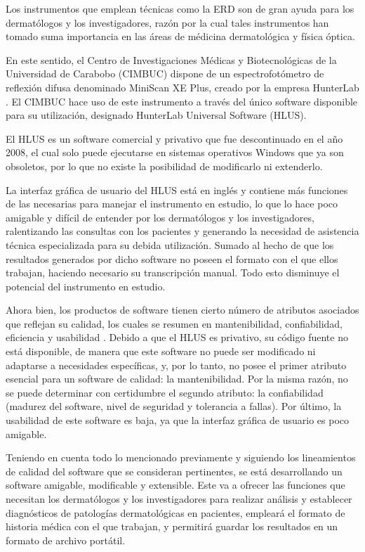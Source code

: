 \documentclass[conference]{IEEEtran}
\begin{document}
Los instrumentos que emplean t\'{e}cnicas como la ERD son de gran ayuda para los dermat\'{o}logos y los investigadores, raz\'{o}n por la cual tales instrumentos han tomado suma importancia en las \'{a}reas de m\'{e}dicina dermatol\'{o}gica y f\'{i}sica \'{o}ptica.

En este sentido, el Centro de Investigaciones M\'{e}dicas y Biotecnol\'{o}gicas de la Universidad de Carabobo \mbox{(CIMBUC)} dispone de un espectrofot\'{o}metro de reflexi\'{o}n difusa \mbox{denominado} MiniScan XE Plus, creado por la empresa HunterLab \cite{HunterLab}. El CIMBUC hace uso de este instrumento a trav\'{e}s del \'{u}nico software disponible para su utilizaci\'{o}n, designado HunterLab Universal Software (HLUS)\cite{HunterLab-manual}.

El HLUS es un software \mbox{comercial} y privativo que fue descontinuado en el a\~{n}o 2008, el cual solo puede ejecutarse en \mbox{sistemas} \mbox{operativos} Windows que ya son obsoletos, por lo que no existe la posibilidad de modificarlo ni extenderlo. 

La interfaz gr\'{a}fica de usuario del HLUS est\'{a} en ingl\'{e}s y contiene m\'{a}s funciones de las necesarias para manejar el instrumento en estudio, lo que lo hace poco amigable y dif\'{i}cil de entender por los dermat\'{o}logos y los investigadores, ralentizando las consultas con los pacientes y generando la necesidad de asistencia t\'{e}cnica especializada para su debida utilizaci\'{o}n. Sumado al hecho de que los resultados generados por dicho software no poseen el formato con el que ellos trabajan, haciendo necesario su transcripci\'{o}n manual. Todo esto disminuye el potencial del instrumento en estudio.

Ahora bien, los productos de software tienen cierto n\'{u}mero de atributos asociados que reflejan su calidad, los cuales se resumen en mantenibilidad, confiabilidad, eficiencia y usabilidad \cite{Sommerville}. Debido a que el HLUS es \mbox{privativo}, su c\'{o}digo fuente no est\'{a} disponible, de manera que este software no puede ser modificado ni adaptarse a necesidades espec\'{i}ficas, y, por lo tanto, no posee el primer atributo esencial para un software de calidad: la mantenibilidad. Por la misma raz\'{o}n, no se puede determinar con certidumbre el segundo atributo: la confiabilidad (madurez del software, nivel de seguridad y tolerancia a fallas). Por \'{u}ltimo, la usabilidad de este software es baja, ya que la interfaz gr\'{a}fica de usuario es poco amigable.

Teniendo en cuenta todo lo mencionado previamente y siguiendo los lineamientos de calidad del \mbox{software} que se consideran pertinentes, se est\'{a} desarrollando un \mbox{software} amigable, modificable y extensible. Este va a ofrecer las funciones que necesitan los dermat\'{o}logos y  los investigadores para realizar an\'{a}lisis y establecer \mbox{diagn\'{o}sticos} de patolog\'{i}as dermatol\'{o}gicas en pacientes, emplear\'{a} el formato de historia m\'{e}dica con el que trabajan, y permitir\'{a} guardar los resultados en un formato de archivo port\'{a}til. 
\end{document}
